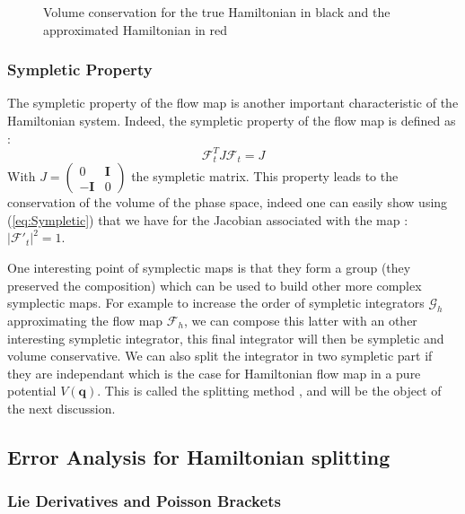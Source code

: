 \documentclass[ansiapaper]{report}
\begin{document}
\begin{multicols}{3}
	\begin{figure}[H]
		\def\svgwidth{\linewidth}
		
		\caption{Volume conservation for the true Hamiltonian in black and the approximated Hamiltonian in red}
		\vspace{0.15cm}
	\end{figure}

	\subsubsection{Sympletic Property}
	The sympletic property of the flow map is another important characteristic of the Hamiltonian system. Indeed, the sympletic property of the flow map is defined as :
	\begin{equation}
    \mathcal{F}_t^T J \mathcal{F}_t = J
	   \label{eq:Sympletic}
	\end{equation}
With $J = \begin{pmatrix}
			0           & \textbf{I} \\
			-\textbf{I} & 0
		\end{pmatrix}$
        the sympletic matrix. This property leads to the conservation of the volume of the phase space, indeed one can easily show using (\ref{eq:Sympletic}) that we have  for the Jacobian associated with the map : $\lvert \mathcal{F'}_t\rvert^2 = 1 $.

        One interesting point of symplectic maps is that they form a group (they preserved the composition) which can be used to build other more complex symplectic maps. For example to increase the order of sympletic integrators $\mathcal{G}_h$  approximating the flow map $\mathcal{F}_h$, we can compose this latter with an other interesting sympletic integrator, this final integrator will then be sympletic and volume conservative. We can also split the integrator in two sympletic part if they are independant which is the case for Hamiltonian flow map in a pure potential $V(\textbf{q})$. This is called the splitting method \cite{MD_theo}, and will be the object of the next discussion.

	\subsection{Error Analysis for Hamiltonian splitting}

	\subsubsection{Lie Derivatives and Poisson Brackets}


\end{multicols}
\end{document}

